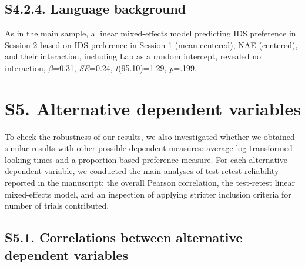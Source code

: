 \documentclass[
  man, donotrepeattitle,floatsintext]{apa6}
\begin{document}
\hypertarget{s4.2.4.-language-background}{%
\subsection{S4.2.4. Language background}\label{s4.2.4.-language-background}}

As in the main sample, a linear mixed-effects model predicting IDS preference in Session 2 based on IDS preference in Session 1 (mean-centered), NAE (centered), and their interaction, including Lab as a random intercept, revealed no interaction, \(\beta\)=0.31, \emph{SE}=0.24, \emph{t}(95.10)=1.29, \emph{p}=.199.

\newpage

\hypertarget{s5.-alternative-dependent-variables}{%
\section{S5. Alternative dependent variables}\label{s5.-alternative-dependent-variables}}

To check the robustness of our results, we also investigated whether we obtained similar results with other possible dependent measures: average log-transformed looking times and a proportion-based preference measure. For each alternative dependent variable, we conducted the main analyses of test-retest reliability reported in the manuscript: the overall Pearson correlation, the test-retest linear mixed-effects model, and an inspection of applying stricter inclusion criteria for number of trials contributed.

\hypertarget{s5.1.-correlations-between-alternative-dependent-variables}{%
\subsection{S5.1. Correlations between alternative dependent variables}\label{s5.1.-correlations-between-alternative-dependent-variables}}
\end{document}
